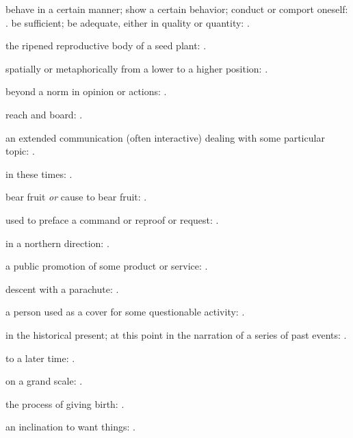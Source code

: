   behave in a certain manner; show a certain behavior; conduct or comport oneself:   . be sufficient; be adequate, either in quality or quantity:   .

  the ripened reproductive body of a seed plant: .

  spatially or metaphorically from a lower to a higher position:   .

  beyond a norm in opinion or actions: .

  reach and board: .

  an extended communication (often interactive) dealing with some particular topic:   .

  in these times:   .

  bear fruit \textit{or} cause to bear fruit: .

  used to preface a command or reproof or request: .

  in a northern direction:   .

  a public promotion of some product or service:   .

  descent with a parachute:   .

  a person used as a cover for some questionable activity:   .

  in the historical present; at this point in the narration of a series of past events: .

  to a later time:   .

  on a grand scale: .

  the process of giving birth:   .

  an inclination to want things: .

